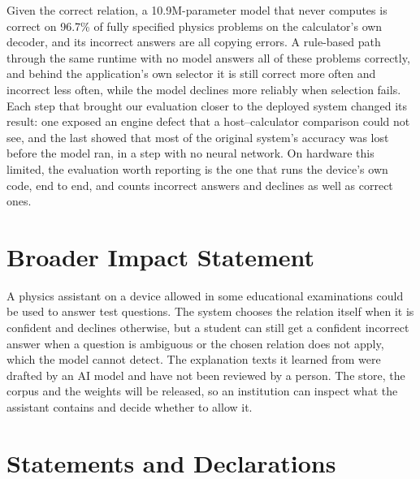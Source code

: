 \documentclass[10pt]{article}
\begin{document}
Given the correct relation, a 10.9M-parameter model that never computes is correct on 96.7\% of fully specified
physics problems on the calculator's own decoder, and its incorrect answers are all copying errors. A
rule-based path through the same runtime with no model answers all of these problems correctly, and behind
the application's own selector it is still correct more often and incorrect less often, while the model
declines more reliably when selection fails. Each step that brought our evaluation closer to the
deployed system changed its result: one exposed an engine defect that a host--calculator comparison could
not see, and the last showed that most of the original system's accuracy was lost before the model ran,
in a step with no neural network. On hardware this limited, the evaluation worth reporting is the one that
runs the device's own code, end to end, and counts incorrect answers and declines as well as correct ones.

\label{endofmain}

\section*{Broader Impact Statement}

A physics assistant on a device allowed in some educational examinations could be used to answer test
questions. The system chooses the relation itself when it is confident and declines otherwise, but
a student can still get a confident incorrect answer when a question is ambiguous or the chosen relation
does not apply, which the model cannot detect. The explanation texts it learned from were drafted by
an AI model and have not been reviewed by a person. The store, the corpus and the weights will be
released, so an institution can inspect what the assistant contains and decide whether to allow it.

\section*{Statements and Declarations}
\end{document}
